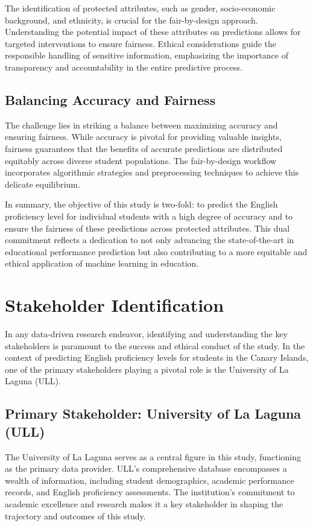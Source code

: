 \documentclass[12pt,a4paper,openright,twoside]{book}
\begin{document}
The identification of protected attributes, such as gender, socio-economic background, and ethnicity, is crucial for the fair-by-design approach. Understanding the potential impact of these attributes on predictions allows for targeted interventions to ensure fairness. Ethical considerations guide the responsible handling of sensitive information, emphasizing the importance of transparency and accountability in the entire predictive process.

\subsection{Balancing Accuracy and Fairness}

The challenge lies in striking a balance between maximizing accuracy and ensuring fairness. While accuracy is pivotal for providing valuable insights, fairness guarantees that the benefits of accurate predictions are distributed equitably across diverse student populations. The fair-by-design workflow incorporates algorithmic strategies and preprocessing techniques to achieve this delicate equilibrium.

In summary, the objective of this study is two-fold: to predict the English proficiency level for individual students with a high degree of accuracy and to ensure the fairness of these predictions across protected attributes. This dual commitment reflects a dedication to not only advancing the state-of-the-art in educational performance prediction but also contributing to a more equitable and ethical application of machine learning in education.

\section{Stakeholder Identification}

In any data-driven research endeavor, identifying and understanding the key stakeholders is paramount to the success and ethical conduct of the study. In the context of predicting English proficiency levels for students in the Canary Islands, one of the primary stakeholders playing a pivotal role is the University of La Laguna (ULL).

\subsection{Primary Stakeholder: University of La Laguna (ULL)}

The University of La Laguna serves as a central figure in this study, functioning as the primary data provider. ULL's comprehensive database encompasses a wealth of information, including student demographics, academic performance records, and English proficiency assessments. The institution's commitment to academic excellence and research makes it a key stakeholder in shaping the trajectory and outcomes of this study.
\end{document}
